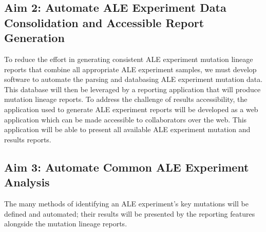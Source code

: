 \documentclass[12pt,final,masters,chapterheads]{ucsd}  %
\begin{document}
\subsection{Aim 2: Automate ALE Experiment Data Consolidation and Accessible Report Generation}
To reduce the effort in generating consistent ALE experiment mutation lineage reports that combine all appropriate ALE experiment samples, we must develop software to automate the parsing and databasing ALE experiment mutation data. This database will then be leveraged by a reporting application that will produce mutation lineage reports. To address the challenge of results accessibility, the application used to generate ALE experiment reports will be developed as a web application which can be made accessible to collaborators over the web. This application will be able to present all available ALE experiment mutation and results reports.
\subsection{Aim 3: Automate Common ALE Experiment Analysis}
%
%
The many methods of identifying an ALE experiment's key mutations will be defined and automated; their results will be presented by the reporting features alongside the mutation lineage reports.


\end{document}
